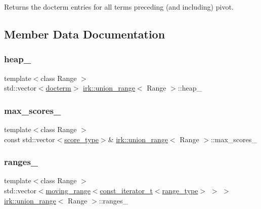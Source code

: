 Returns the docterm entries for all terms preceding (and including) pivot. 

\subsection{Member Data Documentation}
\mbox{\label{classirk_1_1union__range_a7f29027760890cf7491bb10753f36b61}} 
\subsubsection{\texorpdfstring{heap\+\_\+}{heap\_}}
{\footnotesize\ttfamily template$<$class Range $>$ \\
std\+::vector$<$\mbox{\hyperlink{structirk_1_1union__range_1_1docterm}{docterm}}$>$ \mbox{\hyperlink{classirk_1_1union__range}{irk\+::union\+\_\+range}}$<$ Range $>$\+::heap\+\_\+\hspace{0.3cm}{\ttfamily [protected]}}

\mbox{\label{classirk_1_1union__range_accd3b6fdbaccc21952e2586985f2373e}} 
\subsubsection{\texorpdfstring{max\+\_\+scores\+\_\+}{max\_scores\_}}
{\footnotesize\ttfamily template$<$class Range $>$ \\
const std\+::vector$<$\mbox{\hyperlink{classirk_1_1union__range_af728218b976df464ebb051a9e5358e93}{score\+\_\+type}}$>$\& \mbox{\hyperlink{classirk_1_1union__range}{irk\+::union\+\_\+range}}$<$ Range $>$\+::max\+\_\+scores\+\_\+\hspace{0.3cm}{\ttfamily [protected]}}

\mbox{\label{classirk_1_1union__range_a88706eebcc62dd8386d9ad7042d4af2a}} 
\subsubsection{\texorpdfstring{ranges\+\_\+}{ranges\_}}
{\footnotesize\ttfamily template$<$class Range $>$ \\
std\+::vector$<$\mbox{\hyperlink{structirk_1_1moving__range}{moving\+\_\+range}}$<$\mbox{\hyperlink{namespaceirk_a90f7893fdbf95c6dcc2302148eb0bddb}{const\+\_\+iterator\+\_\+t}}$<$\mbox{\hyperlink{classirk_1_1union__range_aae1621f1e73b1b78990ad11eaa52452b}{range\+\_\+type}}$>$ $>$ $>$ \mbox{\hyperlink{classirk_1_1union__range}{irk\+::union\+\_\+range}}$<$ Range $>$\+::ranges\+\_\+\hspace{0.3cm}{\ttfamily [protected]}}

